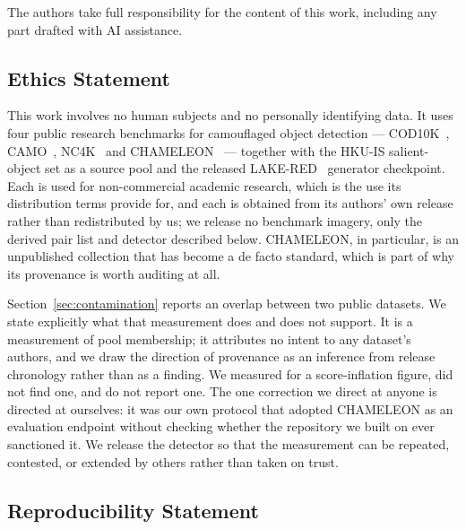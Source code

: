 \documentclass{article}
\begin{document}
The authors take full responsibility for the content of this work, including any part drafted with
AI assistance.

\subsection*{Ethics Statement}

This work involves no human subjects and no personally identifying data. It uses four public
research benchmarks for camouflaged object detection --- COD10K~\citep{fan2022concealed},
CAMO~\citep{le2019anabranch}, NC4K~\citep{lv2021simultaneously} and
CHAMELEON~\citep{skurowski2018animal} --- together with the HKU-IS salient-object set as a source
pool and the released LAKE-RED~\citep{zhao2024lakered} generator checkpoint. Each is used for
non-commercial academic research, which is the use its distribution terms provide for, and each is
obtained from its authors' own release rather than redistributed by us; we release no benchmark
imagery, only the derived pair list and detector described below.
CHAMELEON, in particular, is an unpublished collection that has become a de facto standard, which is
part of why its provenance is worth auditing at all.

Section~\ref{sec:contamination} reports an overlap between two public datasets. We state explicitly
what that measurement does and does not support. It is a measurement of pool membership; it attributes
no intent to any dataset's authors, and we draw the direction of provenance as an inference from
release chronology rather than as a finding. We measured for a score-inflation figure, did not find
one, and do not report one. The one correction we direct at anyone is directed at ourselves: it was
our own protocol that adopted CHAMELEON as an evaluation endpoint without checking whether the
repository we built on ever sanctioned it. We release the detector so that the measurement can be
repeated, contested, or extended by others rather than taken on trust.

\subsection*{Reproducibility Statement}
\end{document}

